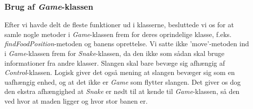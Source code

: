 \subsubsection{Brug af \textit{Game}-klassen}
Efter vi havde delt de fleste funktioner ud i klasserne, besluttede vi os for at samle nogle metoder i \textit{Game}-klassen frem for deres oprindelige klasse, f.eks. \textit{findFoodPosition}-metoden og banens oprettelse. Vi satte ikke 'move'-metoden ind i \textit{Game}-klassen frem for \textit{Snake}-klassen, da den ikke som sådan skal bruge informationer fra andre klasser. Slangen skal bare bevæge sig afhængig af \textit{Control}-klassen. Logisk giver det også mening at slangen bevæger sig som en uafhængig enhed, og at det ikke er \textit{Game} som flytter slangen. Det giver os dog den ekstra afhængighed at \textit{Snake} er nødt til at kende til \textit{Game}-klassen, så den ved hvor at maden ligger og hvor stor banen er.